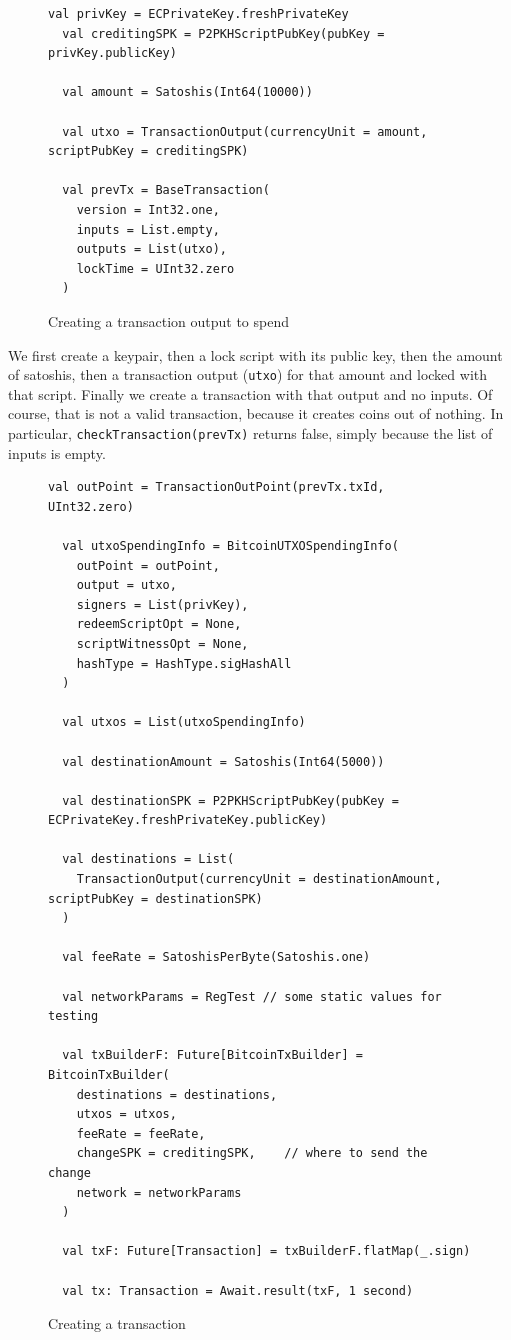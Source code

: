 \documentclass[runningheads]{llncs}
\begin{document}
\begin{figure}
\begin{lstlisting}[style=scala]
  val privKey = ECPrivateKey.freshPrivateKey
  val creditingSPK = P2PKHScriptPubKey(pubKey = privKey.publicKey)

  val amount = Satoshis(Int64(10000))

  val utxo = TransactionOutput(currencyUnit = amount, scriptPubKey = creditingSPK)

  val prevTx = BaseTransaction(
    version = Int32.one,
    inputs = List.empty,
    outputs = List(utxo),
    lockTime = UInt32.zero
  )
\end{lstlisting}
  
  \caption{Creating a transaction output to spend}
  \label{fig:prevtx}
\end{figure}

We first create a keypair, then a lock script with its public key,
then the amount of satoshis, then a transaction output (\texttt{utxo})
for that amount and locked with that script. Finally we create a
transaction with that output and no inputs. Of course, that is not a
valid transaction, because it creates coins out of nothing. In
particular, \texttt{checkTransaction(prevTx)} returns false, simply
because the list of inputs is empty.

\begin{figure}
\begin{lstlisting}[style=scala]
  val outPoint = TransactionOutPoint(prevTx.txId, UInt32.zero)

  val utxoSpendingInfo = BitcoinUTXOSpendingInfo(
    outPoint = outPoint,
    output = utxo,
    signers = List(privKey),
    redeemScriptOpt = None,
    scriptWitnessOpt = None,
    hashType = HashType.sigHashAll
  )

  val utxos = List(utxoSpendingInfo)

  val destinationAmount = Satoshis(Int64(5000))

  val destinationSPK = P2PKHScriptPubKey(pubKey = ECPrivateKey.freshPrivateKey.publicKey)

  val destinations = List(
    TransactionOutput(currencyUnit = destinationAmount, scriptPubKey = destinationSPK)
  )

  val feeRate = SatoshisPerByte(Satoshis.one)

  val networkParams = RegTest // some static values for testing

  val txBuilderF: Future[BitcoinTxBuilder] = BitcoinTxBuilder(
    destinations = destinations, 
    utxos = utxos,               
    feeRate = feeRate,           
    changeSPK = creditingSPK,    // where to send the change
    network = networkParams      
  )

  val txF: Future[Transaction] = txBuilderF.flatMap(_.sign)

  val tx: Transaction = Await.result(txF, 1 second)
\end{lstlisting}
  \caption{Creating a transaction}
  \label{fig:tx}
\end{figure}
\end{document}
